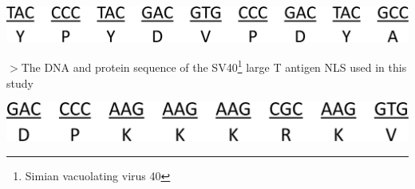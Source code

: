 \graphicspath{{figures/}}
\noindent \includegraphics[width=\textwidth-55mm]{figJ-4.jpg}

\noindent $>$The DNA and protein sequence of the SV40\footnote{Simian vacuolating virus 40} large T antigen NLS used in this study
\vspace{2mm}

\graphicspath{{figures/}}
\noindent \includegraphics[width=\textwidth-65mm]{figJ-5.jpg}
